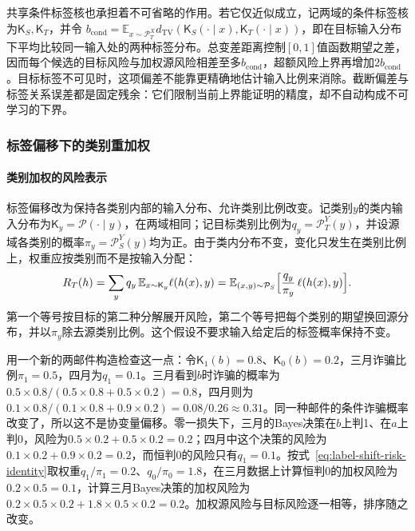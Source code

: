 共享条件标签核也承担着不可省略的作用。若它仅近似成立，记两域的条件标签核为$\mathsf K_S,\mathsf K_T$，并令
$b_{\mathrm{cond}}=\mathbb E_{x\sim\mathcal P_T^X}d_{\mathrm{TV}}(\mathsf K_S(\cdot\mid x),\mathsf K_T(\cdot\mid x))$，即在目标输入分布下平均比较同一输入处的两种标签分布。总变差距离控制$[0,1]$值函数期望之差，因而每个候选的目标风险与加权源风险相差至多$b_{\mathrm{cond}}$，超额风险上界再增加$2b_{\mathrm{cond}}$。目标标签不可见时，这项偏差不能靠更精确地估计输入比例来消除。截断偏差与标签关系误差都是固定残余：它们限制当前上界能证明的精度，却不自动构成不可学习的下界。

\subsubsection{标签偏移下的类别重加权}
\label{sec:adaptation-label-shift}

\paragraph{类别加权的风险表示}
标签偏移改为保持各类别内部的输入分布、允许类别比例改变。记类别$y$的类内输入分布为$\mathsf K_y=\mathcal P(\cdot\mid y)$，在两域相同；记目标类别比例为$q_y=\mathcal P_T^Y(y)$，并设源域各类别的概率$\pi_y=\mathcal P_S^Y(y)$均为正。由于类内分布不变，变化只发生在类别比例上，权重应按类别而不是按输入分配：
\begin{equation}
 R_T(h)=\sum_y q_y\,\mathbb E_{x\sim\mathsf K_y}\ell(h(x),y)
       =\mathbb E_{(x,y)\sim\mathcal P_S}\Bigl[\frac{q_y}{\pi_y}\,\ell(h(x),y)\Bigr].
 \label{eq:label-shift-risk-identity}
\end{equation}
第一个等号按目标的第二种分解展开风险，第二个等号把每个类别的期望换回源分布，并以$\pi_y$除去源类别比例。这个假设不要求输入给定后的标签概率保持不变。

用一个新的两邮件构造检查这一点：令$\mathsf K_1(b)=0.8$、$\mathsf K_0(b)=0.2$，三月诈骗比例$\pi_1=0.5$，四月为$q_1=0.1$。三月看到$b$时诈骗的概率为$0.5\times0.8/(0.5\times0.8+0.5\times0.2)=0.8$，四月则为$0.1\times0.8/(0.1\times0.8+0.9\times0.2)=0.08/0.26\approx0.31$。同一种邮件的条件诈骗概率改变了，所以这不是协变量偏移。零一损失下，三月的Bayes决策在$b$上判1、在$a$上判0，风险为$0.5\times0.2+0.5\times0.2=0.2$；四月中这个决策的风险为$0.1\times0.2+0.9\times0.2=0.2$，而恒判0的风险只有$q_1=0.1$。按式~\eqref{eq:label-shift-risk-identity}取权重$q_1/\pi_1=0.2$、$q_0/\pi_0=1.8$，在三月数据上计算恒判0的加权风险为$0.2\times0.5=0.1$，计算三月Bayes决策的加权风险为$0.2\times0.5\times0.2+1.8\times0.5\times0.2=0.2$。加权源风险与目标风险逐一相等，排序随之改变。
